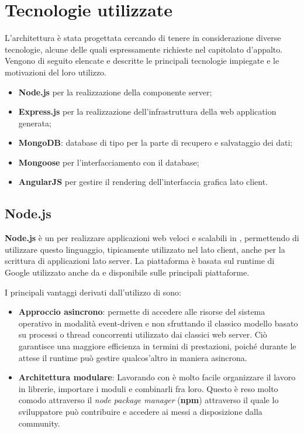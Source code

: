 \section{Tecnologie utilizzate}


L'architettura è stata progettata cercando di tenere in considerazione diverse tecnologie, alcune delle quali espressamente richieste nel capitolato d'appalto. Vengono di seguito elencate e descritte le principali tecnologie impiegate e le motivazioni del loro utilizzo.

\begin{itemize}
	\item \textbf{Node.js} per la realizzazione della componente server;
	\item \textbf{Express.js} per la realizzazione dell’infrastruttura della web application generata;
	\item \textbf{MongoDB}: database di tipo  per la parte di recupero e salvataggio dei dati;
	\item \textbf{Mongoose} per l’interfacciamento con il database;
	\item \textbf{AngularJS} per gestire il rendering dell'interfaccia grafica lato client.
\end{itemize}


\subsection{Node.js}
\textbf{Node.js} è un  per realizzare applicazioni web veloci e scalabili in , permettendo di utilizzare questo linguaggio, tipicamente utilizzato nel lato client, anche per la scrittura di applicazioni lato server.
La piattaforma è basata sul runtime di Google  utilizzato anche da  e disponibile sulle principali piattaforme.

I principali vantaggi derivati dall'utilizzo di  sono:
\begin{itemize}
	\item \textbf{Approccio asincrono}:  permette di accedere alle risorse del sistema operativo in modalità event-driven e non sfruttando il classico modello basato su processi o thread concorrenti utilizzato dai classici web server. Ciò garantisce una maggiore efficienza in termini di prestazioni, poiché durante le attese il runtime può gestire qualcos’altro in maniera asincrona.
	\item \textbf{Architettura modulare}: Lavorando con  è molto facile organizzare il lavoro in librerie, importare i moduli e combinarli fra loro. Questo è reso molto comodo attraverso il \emph{node package manager} (\textbf{npm}) attraverso il quale lo sviluppatore può contribuire e accedere ai  messi a disposizione dalla community.
\end{itemize}

